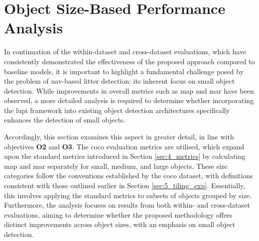\section{Object Size-Based Performance Analysis}
\label{sec:5_object_size_performance}

In continuation of the within-dataset and cross-dataset evaluations, which have consistently demonstrated the effectiveness of the proposed approach compared to baseline models, it is important to highlight a fundamental challenge posed by the problem of \gls{uav}-based litter detection: its inherent focus on small object detection. While improvements in overall metrics such as \gls{map} and \gls{mar} have been observed, a more detailed analysis is required to determine whether incorporating the \gls{lupi} framework into existing object detection architectures specifically enhances the detection of small objects.

Accordingly, this section examines this aspect in greater detail, in line with objectives \textbf{O2} and \textbf{O3}. The \gls{coco} evaluation metrics are utilised, which expand upon the standard metrics introduced in Section \ref{sec:4_metrics} by calculating \gls{map} and \gls{mar} separately for small, medium, and large objects. These size categories follow the conventions established by the \gls{coco} dataset, with definitions consistent with those outlined earlier in Section \ref{sec:5_tiling_exp}. Essentially, this involves applying the standard metrics to subsets of objects grouped by size. Furthermore, the analysis focuses on results from both within- and cross-dataset evaluations, aiming to determine whether the proposed methodology offers distinct improvements across object sizes, with an emphasis on small object detection.

